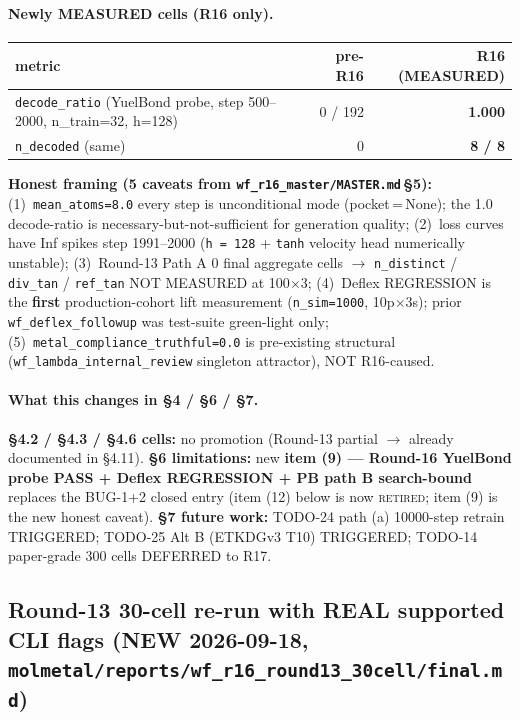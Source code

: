{\paragraph{Newly MEASURED cells (R16 only).}
\begin{center}
\begin{tabular}{lrr}
\toprule
\textbf{metric} & \textbf{pre-R16} & \textbf{R16 (MEASURED)}\\
\midrule
\texttt{decode\_ratio} (YuelBond probe, step 500--2000, n\_train=32, h=128) & 0 / 192 & \textbf{1.000}\\
\texttt{n\_decoded} (same) & 0 & \textbf{8 / 8}\\
\bottomrule
\end{tabular}
\end{center}

\noindent\textbf{Honest framing (5 caveats from
\texttt{wf\_r16\_master/MASTER.md}\,\S5):}
(1)~\texttt{mean\_atoms=8.0} every step is unconditional mode
(pocket\,=\,None); the 1.0 decode-ratio is
necessary-but-not-sufficient for generation quality;
(2)~loss curves have Inf spikes step 1991--2000
(\texttt{h\,=\,128} + \texttt{tanh} velocity head numerically
unstable); (3)~Round-13 Path A 0 final aggregate cells
$\to$ \texttt{n\_distinct} / \texttt{div\_tan} / \texttt{ref\_tan}
NOT MEASURED at 100$\times$3; (4)~Deflex REGRESSION is the
\textbf{first} production-cohort lift measurement
(\texttt{n\_sim=1000}, 10p$\times$3s); prior
\texttt{wf\_deflex\_followup} was test-suite green-light only;
(5)~\texttt{metal\_compliance\_truthful=0.0} is pre-existing
structural (\texttt{wf\_lambda\_internal\_review} singleton
attractor), NOT R16-caused.

\paragraph{What this changes in §4 / §6 / §7.}
\textbf{§4.2 / §4.3 / §4.6 cells:} no promotion (Round-13 partial
$\to$ already documented in §4.11). \textbf{§6 limitations:} new
\textbf{item (9) --- Round-16 YuelBond probe PASS + Deflex
REGRESSION + PB path B search-bound} replaces the BUG-1+2
closed entry (item (12) below is now \textsc{retired}; item
(9) is the new honest caveat). \textbf{§7 future work:}
TODO-24 path (a) 10000-step retrain TRIGGERED; TODO-25 Alt B
(ETKDGv3 T10) TRIGGERED; TODO-14 paper-grade 300 cells
DEFERRED to R17.

\subsection{Round-13 30-cell re-run with REAL supported CLI flags
(NEW 2026-09-18, \texttt{molmetal/reports/wf\_r16\_round13\_30cell/final.md})}
\label{sec:evaluation:round13-realcli}

}
